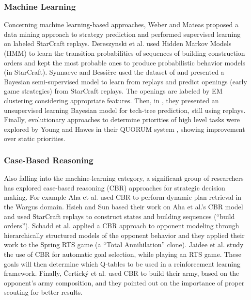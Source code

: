 \documentclass{llncs}
\begin{document}
\subsubsection*{Machine Learning}
Concerning  machine   learning-based  approaches,  Weber   and  Mateas
\cite{WeberCig09}  proposed   a  data  mining  approach   to  strategy
prediction  and performed  supervised  learning  on labeled  StarCraft
replays.  Dereszynski et  al. \cite{HMMstrat_RTS_AIIDE11}  used Hidden
Markov Models (HMM) to learn the transition probabilities of sequences
of building  construction orders  and kept the  most probable  ones to
produce  probabilistic behavior  models (in  StarCraft). Synnaeve  and
Bessi\`{e}re   \cite{SynnaeveOpeningCig11}   used   the   dataset   of
\cite{WeberCig09} and  presented a  Bayesian semi-supervised  model to
learn from replays  and predict openings (early  game strategies) from
StarCraft  replays.   The  openings  are  labeled   by  EM  clustering
considering  appropriate  features. Then,  in  \cite{SynnaeveAIIDE11},
they presented  an unsupervised learning Bayesian  model for tech-tree
prediction, still using
replays. %
Finally, evolutionary approaches to determine priorities of high level
tasks  were  explored  by  Young  and Hawes  in  their  QUORUM  system
\cite{young2012evolutionary},   showing    improvement   over   static
priorities.

\subsubsection*{Case-Based Reasoning}
Also falling  into the machine-learning category,  a significant group
of    researchers   has    explored    case-based   reasoning    (CBR)
\cite{Aamodt94CBR}  approaches  for  strategic  decision  making.  For
example  Aha  et al.  \cite{LTW}  used  CBR  to perform  dynamic  plan
retrieval in  the Wargus domain.  Hsieh and Sun  \cite{HsiehS08} based
their work  on Aha et  al.'s CBR  model \cite{LTW} and  used StarCraft
replays   to  construct   states  and   building  sequences   (``build
orders''). Schadd et  al. \cite{SchaddBS07} applied a  CBR approach to
opponent  modeling through  hierarchically  structured  models of  the
opponent behavior and  they applied their work to the  Spring RTS game
(a ``Total Annihilation'' clone).  Jaidee et al. \cite{jaidee2011case}
study the  use of CBR for  automatic goal selection, while  playing an
RTS game. These goals will then determine which Q-tables to be used in
a  reinforcement  learning  framework.  Finally,  \v{C}ertick\'{y}  et
al. \cite{certicky2013cbr} used CBR to  build their army, based on the
opponent's army composition, and they pointed out on the importance of
proper scouting for better results.
\end{document}

